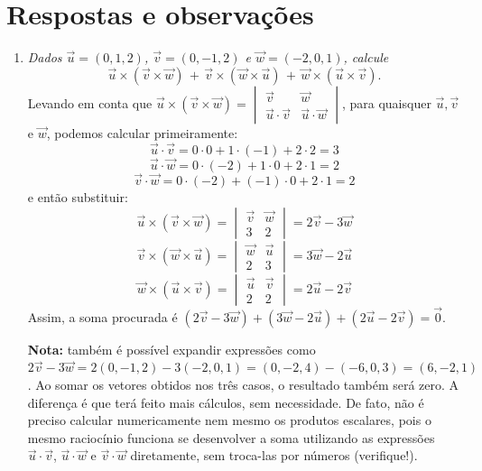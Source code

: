\documentclass[12pt,a4paper]{article}
\begin{document}
\section*{Respostas e observações}

\begin{enumerate}
\item \textit{Dados $\vec{u}=(0,1,2)$, $\vec{v}=(0,-1,2)$ e $\vec{w}=(-2,0,1)$, calcule
\[
  \vec{u} \times (\vec{v} \times \vec{w}) \, + \,
  \vec{v} \times (\vec{w} \times \vec{u}) \, + \,
  \vec{w} \times (\vec{u} \times \vec{v}).
\]
}
Levando em conta que $\vec{u} \times (\vec{v} \times \vec{w})
= \begin{vmatrix}
\vec{v} & \vec{w} \\
\vec{u} \cdot \vec{v} & \vec{u} \cdot \vec{w}
\end{vmatrix}$, para quaisquer $\vec{u}, \vec{v}$ e $\vec{w}$, podemos calcular primeiramente:
\[
\vec{u} \cdot \vec{v} = 0 \cdot 0 + 1 \cdot (-1) + 2 \cdot 2 = 3
\]
\[
\vec{u} \cdot \vec{w} = 0 \cdot (-2) + 1 \cdot 0 + 2 \cdot 1 = 2
\]
\[
\vec{v} \cdot \vec{w} = 0 \cdot (-2) + (-1) \cdot 0 + 2 \cdot 1 = 2
\]
e então substituir:
\[
\vec{u} \times (\vec{v} \times \vec{w})
= \begin{vmatrix}
\vec{v} & \vec{w} \\
3 & 2
\end{vmatrix}
= 2\vec{v} -3 \vec{w}
\]
\[
\vec{v} \times (\vec{w} \times \vec{u})
= \begin{vmatrix}
\vec{w} & \vec{u} \\
2 & 3
\end{vmatrix}
= 3\vec{w} -2 \vec{u}
\]
\[
\vec{w} \times (\vec{u} \times \vec{v})
= \begin{vmatrix}
\vec{u} & \vec{v} \\
2 & 2
\end{vmatrix}
= 2\vec{u} -2 \vec{v}
\]
Assim, a soma procurada é $(2\vec{v} -3 \vec{w}) + (3\vec{w} -2 \vec{u}) + (2\vec{u} -2 \vec{v}) = \vec{0}$.

\textbf{Nota:} também é possível expandir expressões como $2\vec{v} -3 \vec{w} = 2(0,-1,2) -3(-2,0,1) = (0,-2,4) - (-6,0,3) = (6,-2,1)$. Ao somar os vetores obtidos nos três casos, o resultado também será zero. A diferença é que terá feito mais cálculos, sem necessidade. De fato, não é preciso calcular numericamente nem mesmo os produtos escalares, pois o mesmo raciocínio funciona se desenvolver a soma utilizando as expressões $\vec{u} \cdot \vec{v}$, $\vec{u} \cdot \vec{w}$ e $\vec{v} \cdot \vec{w}$ diretamente, sem troca-las por números (verifique!).


\end{enumerate}
\end{document}
